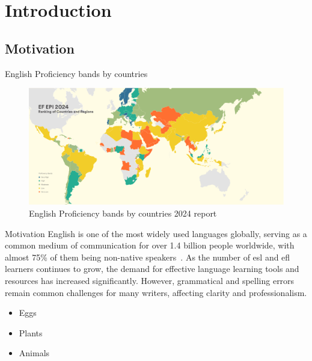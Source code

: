 \section{Introduction}

\subsection{Motivation}
\begin{frame}{English Proficiency bands by countries}
  \begin{figure}
    \begin{center}
      \includegraphics[width=\textwidth]{figures/ef-epi-2024-english-crop.pdf}
    \end{center}
    \caption{English Proficiency bands by countries 2024 report}\label{fig:ef-epi}
  \end{figure}
\end{frame}

\begin{frame}{Motivation}
  English is one of the most widely used languages globally, serving as a common medium of communication for over \alert{1.4 billion} people worldwide, with almost \alert{75\%} of them being non-native speakers~\citep{eberhard2015ethnologue}.
  As the number of esl and efl learners continues to grow, the demand for effective language learning tools and resources has increased significantly.
  However, grammatical and spelling errors remain common challenges for many writers, affecting clarity and professionalism.

  \begin{itemize}
    \item<1-> Eggs
    \item<2-> Plants
    \item<3-> Animals
  \end{itemize}
\end{frame}
